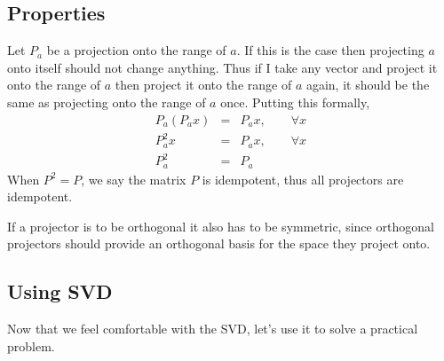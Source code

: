 \subsection{Properties}
Let $P_a$ be a projection onto the range of $a$.  If this is the case then projecting $a$ onto itself should not change anything.  Thus if I take any vector and project it onto the range of $a$ then project it onto the range of $a$ again, it should be the same as projecting onto the range of $a$ once.  Putting this formally,
\begin{eqnarray}
P_a(P_a x) & = & P_a x, \qquad\forall x\\
P_a^2 x & = & P_a x, \qquad\forall x\\
P_a^2 & = & P_a
\end{eqnarray}
When $P^2=P$, we say the matrix $P$ is idempotent, thus all projectors are idempotent.

If a projector is to be orthogonal it also has to be symmetric, since orthogonal projectors should provide an orthogonal basis for the space they project onto.

\subsection{Using SVD}
Now that we feel comfortable with the SVD, let's use it to solve a practical problem.